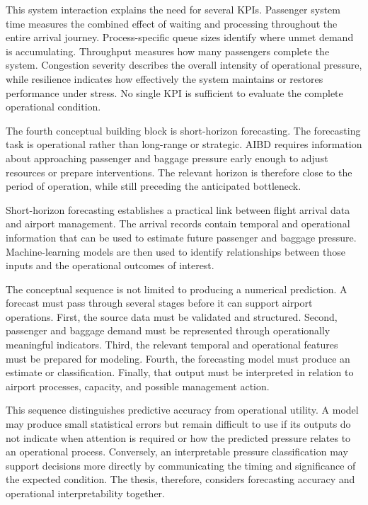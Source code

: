 This system interaction explains the need for several KPIs. Passenger system time measures the combined effect of waiting and processing throughout the entire arrival journey. Process-specific queue sizes identify where unmet demand is accumulating. Throughput measures how many passengers complete the system. Congestion severity describes the overall intensity of operational pressure, while resilience indicates how effectively the system maintains or restores performance under stress. No single KPI is sufficient to evaluate the complete operational condition.

The fourth conceptual building block is short-horizon forecasting. The forecasting task is operational rather than long-range or strategic. AIBD requires information about approaching passenger and baggage pressure early enough to adjust resources or prepare interventions. The relevant horizon is therefore close to the period of operation, while still preceding the anticipated bottleneck.

Short-horizon forecasting establishes a practical link between flight arrival data and airport management. The arrival records contain temporal and operational information that can be used to estimate future passenger and baggage pressure. Machine-learning models are then used to identify relationships between those inputs and the operational outcomes of interest.

The conceptual sequence is not limited to producing a numerical prediction. A forecast must pass through several stages before it can support airport operations. First, the source data must be validated and structured. Second, passenger and baggage demand must be represented through operationally meaningful indicators. Third, the relevant temporal and operational features must be prepared for modeling. Fourth, the forecasting model must produce an estimate or classification. Finally, that output must be interpreted in relation to airport processes, capacity, and possible management action.

This sequence distinguishes predictive accuracy from operational utility. A model may produce small statistical errors but remain difficult to use if its outputs do not indicate when attention is required or how the predicted pressure relates to an operational process. Conversely, an interpretable pressure classification may support decisions more directly by communicating the timing and significance of the expected condition. The thesis, therefore, considers forecasting accuracy and operational interpretability together.

